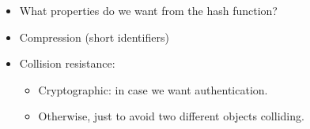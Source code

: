 \begin{frame}
  \begin{exercise}
    \begin{itemize}
      \item What properties do we want from the hash function?
    \end{itemize}
  \end{exercise}
\end{frame}

\begin{frame}
  \begin{solution}
    \begin{itemize}
      \item Compression (short identifiers)
      \item Collision resistance:
        \begin{itemize}
          \item Cryptographic: in case we want authentication.
          \item Otherwise, just to avoid two different objects colliding.
        \end{itemize}
    \end{itemize}
  \end{solution}
\end{frame}

